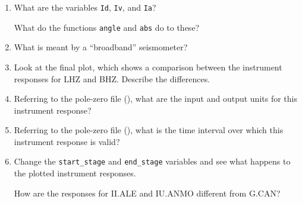 \documentclass[11pt,titlepage,fleqn]{article}
\begin{document}
\begin{enumerate}

\item What are the variables \verb+Id+, \verb+Iv+, and \verb+Ia+?

What do the functions \verb+angle+ and \verb+abs+ do to these?

\item What is meant by a ``broadband'' seismometer?

\item Look at the final plot, which shows a comparison between the instrument responses for LHZ and BHZ. Describe the differences.

\item Referring to the pole-zero file (), what are the input and output units for this instrument response?

\item Referring to the pole-zero file (), what is the time interval over which this instrument response is valid?

\item Change the \verb+start_stage+ and \verb+end_stage+ variables and see what happens to the plotted instrument responses.

How are the responses for II.ALE and IU.ANMO different from G.CAN?

\end{enumerate}

\end{document}
